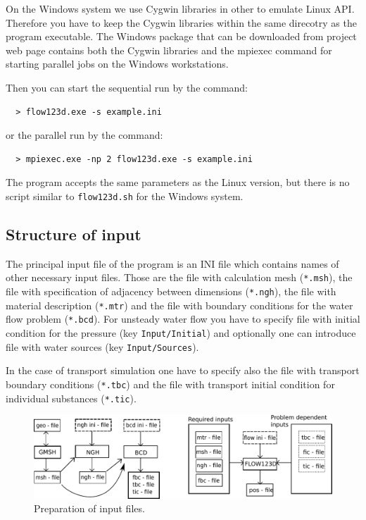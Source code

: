 \documentclass[12pt,a4paper]{report}
\begin{document}
On the Windows system we use Cygwin libraries in other to emulate Linux API. Therefore you have to keep the Cygwin libraries within the same direcotry as the program executable.
The Windows package that can be downloaded from project web page contains both the Cygwin libraries and the mpiexec command for starting parallel jobs on the Windows workstations.

Then you can start the sequential run by the command:
\begin{verbatim}
  > flow123d.exe -s example.ini
\end{verbatim}
or the parallel run by the command:
\begin{verbatim}
  > mpiexec.exe -np 2 flow123d.exe -s example.ini
\end{verbatim}
The program accepts the same parameters as the Linux version, but there is no script similar to \verb'flow123d.sh' for the Windows system.


\subsection{Structure of input}

The principal input file of the program is an INI file which contains names of other necessary input files.
Those are the file with calculation mesh (\verb'*.msh'), the file with specification of adjacency between dimensions (\verb'*.ngh'),
the file with material description (\verb'*.mtr') and the file with boundary conditions for the water flow problem (\verb'*.bcd').
For unsteady water flow you have to specify file with initial condition for the pressure (key \verb'Input/Initial') and optionally one can introduce 
file with water sources (key \verb'Input/Sources').

In the case of transport simulation one have to specify also the file with transport boundary conditions (\verb'*.tbc') 
and the file with transport initial condition
for individual substances (\verb'*.tic').

 \begin{figure}[h]
    \begin{center}
      \includegraphics[scale=0.7]{schema.pdf} %
      \caption{Preparation of input files.}
      \label{obr3}
    \end{center}
  \end{figure}
\end{document}
